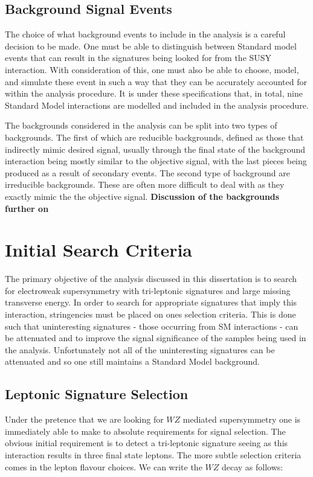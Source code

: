 \subsection{Background Signal Events}
The choice of what background events to include in the analysis is a careful decision to be made.
One must be able to distinguish between Standard model events that can result in the signatures being looked for from the SUSY interaction.
With consideration of this, one must also be able to choose, model, and simulate these event in such a way that they can be accurately accounted for within the analysis procedure.
It is under these specifications that, in total, nine Standard Model interactions are modelled and included in the analysis procedure.

The backgrounds considered in the analysis can be split into two types of backgrounds.
The first of which are reducible backgrounds, defined as those that indirectly mimic desired signal, usually through the final state of the background interaction being mostly similar to the objective signal, with the last pieces being produced as a result of secondary events.
The second type of background are irreducible backgrounds. 
These are often more difficult to deal with as they exactly mimic the the objective signal.
\textbf{Discussion of the backgrounds further on}

\section{Initial Search Criteria}
The primary objective of the analysis discussed in this dissertation is to search for electroweak supersymmetry with tri-leptonic signatures and large missing transverse energy. 
In order to search for appropriate signatures that imply this interaction, stringencies must be placed on ones selection criteria. 
This is done such that uninteresting signatures - those occurring from SM interactions - can be attenuated and to improve the signal significance of the samples being used in the analysis.
Unfortunately not all of the uninteresting signatures can be attenuated and so one still maintains a Standard Model background.

\subsection{Leptonic Signature Selection}
Under the pretence that we are looking for $WZ$ mediated supersymmetry one is immediately able to make to absolute requirements for signal selection.
The obvious initial requirement is to detect a tri-leptonic signature seeing as this interaction results in three final state leptons.
The more subtle selection criteria comes in the lepton flavour choices.
We can write the $WZ$ decay as follows:

